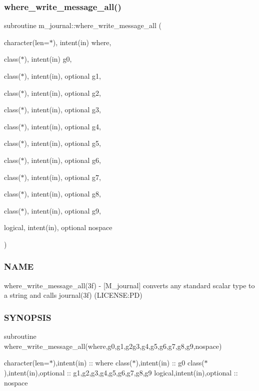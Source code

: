 \subsubsection{\texorpdfstring{where\+\_\+write\+\_\+message\+\_\+all()}{where\_write\_message\_all()}}
{\footnotesize\ttfamily subroutine m\+\_\+journal\+::where\+\_\+write\+\_\+message\+\_\+all (\begin{DoxyParamCaption}\item[{character(len=$\ast$), intent(in)}]{where,  }\item[{class($\ast$), intent(in)}]{g0,  }\item[{class($\ast$), intent(in), optional}]{g1,  }\item[{class($\ast$), intent(in), optional}]{g2,  }\item[{class($\ast$), intent(in), optional}]{g3,  }\item[{class($\ast$), intent(in), optional}]{g4,  }\item[{class($\ast$), intent(in), optional}]{g5,  }\item[{class($\ast$), intent(in), optional}]{g6,  }\item[{class($\ast$), intent(in), optional}]{g7,  }\item[{class($\ast$), intent(in), optional}]{g8,  }\item[{class($\ast$), intent(in), optional}]{g9,  }\item[{logical, intent(in), optional}]{nospace }\end{DoxyParamCaption})\hspace{0.3cm}{\ttfamily [private]}}



\subsubsection*{N\+A\+ME}

where\+\_\+write\+\_\+message\+\_\+all(3f) -\/ \mbox{[}M\+\_\+journal\mbox{]} converts any standard scalar type to a string and calls journal(3f) (L\+I\+C\+E\+N\+SE\+:PD) \subsubsection*{S\+Y\+N\+O\+P\+S\+IS}

subroutine where\+\_\+write\+\_\+message\+\_\+all(where,g0,g1,g2g3,g4,g5,g6,g7,g8,g9,nospace)

character(len=$\ast$),intent(in) \+:\+: where class($\ast$),intent(in) \+:\+: g0 class($\ast$),intent(in),optional \+:\+: g1,g2,g3,g4,g5,g6,g7,g8,g9 logical,intent(in),optional \+:\+: nospace

